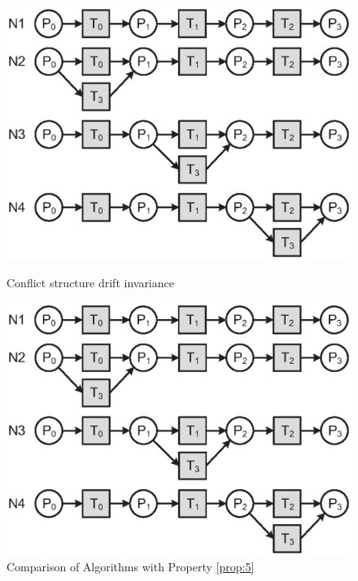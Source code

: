 \documentclass{llncs}
\begin{document}
\begin{figure}[ht]
\centering
\begin{minipage}[t]{0.45\textwidth}
	\centering
	\includegraphics[width=1\textwidth]{fig_property_5.eps}
	\caption{Conflict structure drift invariance}
	\label{fig:property5}
\end{minipage}
\hspace{0.1in}
\begin{minipage}[t]{0.45\textwidth}
	\centering
	\includegraphics[width=1\textwidth]{fig_property_5.eps}
	\caption{Comparison of Algorithms with Property \ref{prop:5}}
	\label{fig:property5comp}
\end{minipage}
\end{figure}
\end{document}
